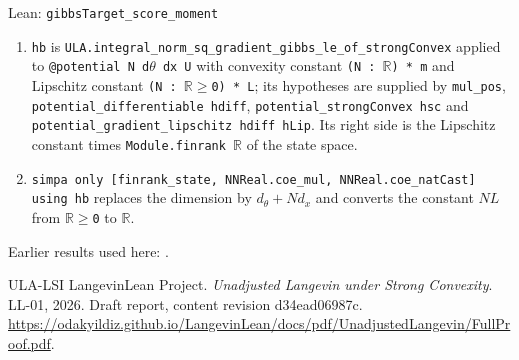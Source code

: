 \documentclass[11pt,a4paper]{article}
\begin{document}
\begin{leanbox}{Lean: \texttt{gibbsTarget\_\allowbreak{}score\_\allowbreak{}moment}}
\begin{enumerate}
\item \texttt{hb} is \texttt{ULA.\allowbreak{}integral\_\allowbreak{}norm\_\allowbreak{}sq\_\allowbreak{}gradient\_\allowbreak{}gibbs\_\allowbreak{}le\_\allowbreak{}of\_\allowbreak{}strong\allowbreak{}Convex} applied to \texttt{@potential N d\ensuremath{\theta} dx U} with convexity constant \texttt{(N : \ensuremath{\mathbb R}) * m} and Lipschitz constant \texttt{(N : \ensuremath{\mathbb R}\ensuremath{\ge}0) * L}; its hypotheses are supplied by \texttt{mul\_\allowbreak{}pos}, \texttt{potential\_\allowbreak{}differentiable hdiff}, \texttt{potential\_\allowbreak{}strong\allowbreak{}Convex hsc} and \texttt{potential\_\allowbreak{}gradient\_\allowbreak{}lipschitz hdiff h\allowbreak{}Lip}. Its right side is the Lipschitz constant times \texttt{Module.\allowbreak{}finrank \ensuremath{\mathbb R}} of the state space.

\item \texttt{simpa only [finrank\_\allowbreak{}state, NNReal.\allowbreak{}coe\_\allowbreak{}mul, NNReal.\allowbreak{}coe\_\allowbreak{}nat\allowbreak{}Cast] using hb} replaces the dimension by \(d_\theta+Nd_x\) and converts the constant \(NL\) from \texttt{\ensuremath{\mathbb R}\ensuremath{\ge}0} to \texttt{\ensuremath{\mathbb R}}.

\end{enumerate}
\end{leanbox}


Earlier results used here: \cite[Section~3.27.8]{LangevinLean2026ULASC}.

\begin{thebibliography}{ULA-LSI}
LangevinLean Project. \emph{Unadjusted Langevin under Strong Convexity}. LL-01, 2026. Draft report, content revision d34ead06987c. \url{https://odakyildiz.github.io/LangevinLean/docs/pdf/UnadjustedLangevin/FullProof.pdf}.
\end{thebibliography}
\end{document}
